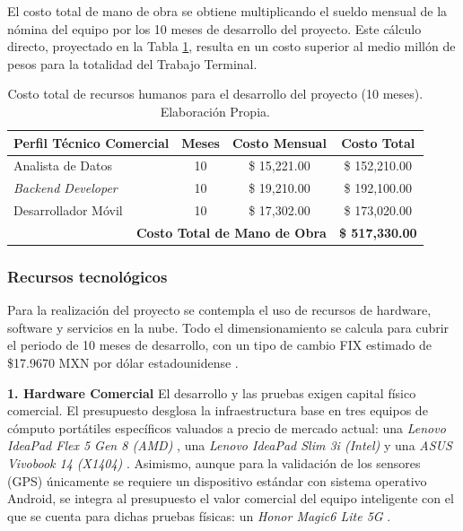 El costo total de mano de obra se obtiene multiplicando el sueldo mensual de la nómina del equipo por los 10 meses de desarrollo del proyecto. Este cálculo directo, proyectado en la Tabla \ref{tab:recursos_humanos}, resulta en un costo superior al medio millón de pesos para la totalidad del Trabajo Terminal.

\begin{table}[htbp]
    \centering
    \caption{Costo total de recursos humanos para el desarrollo del proyecto (10 meses). Elaboración Propia.}
    \label{tab:recursos_humanos}
    \begin{tabularx}{\textwidth}{|X|c|c|c|}
        \hline
        \textbf{Perfil Técnico Comercial} & \textbf{Meses} & \textbf{Costo Mensual} & \textbf{Costo Total} \\ \hline
        Analista de Datos & 10 & \$ 15,221.00 & \$ 152,210.00 \\ \hline
        \textit{Backend Developer} & 10 & \$ 19,210.00 & \$ 192,100.00 \\ \hline
        Desarrollador Móvil & 10 & \$ 17,302.00 & \$ 173,020.00 \\ \hline
        \multicolumn{3}{|r|}{\textbf{Costo Total de Mano de Obra}} & \textbf{\$ 517,330.00} \\ \hline
    \end{tabularx}
    
\end{table}

\subsubsection{Recursos tecnológicos}

Para la realización del proyecto se contempla el uso de recursos de hardware, software y servicios en la nube. Todo el dimensionamiento se calcula para cubrir el periodo de 10 meses de desarrollo, con un tipo de cambio FIX estimado de \$17.9670 MXN por dólar estadounidense \cite{banxico_fix}.

\vspace{1mm}

\textbf{1. Hardware Comercial} 
El desarrollo y las pruebas exigen capital físico comercial. El presupuesto desglosa la infraestructura base en tres equipos de cómputo portátiles específicos valuados a precio de mercado actual: una \textit{Lenovo IdeaPad Flex 5 Gen 8 (AMD)} \cite{lenovo_flex5}, una\textit{ Lenovo IdeaPad Slim 3i (Intel)} \cite{lenovo_slim3i} y una\textit{ ASUS Vivobook 14 (X1404)} \cite{asus_vivobook}. Asimismo, aunque para la validación de los sensores (GPS) únicamente se requiere un dispositivo estándar con sistema operativo Android, se integra al presupuesto el valor comercial del equipo inteligente con el que se cuenta para dichas pruebas físicas: un\textit{ Honor Magic6 Lite 5G} \cite{telcel_honor}.

